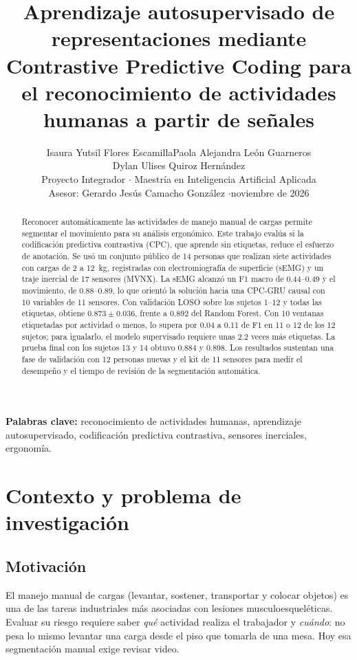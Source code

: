 \documentclass[letterpaper,11pt]{article}
\title{\textbf{Aprendizaje autosupervisado de representaciones mediante Contrastive Predictive Coding para el reconocimiento de actividades humanas a partir de señales}}
\author{Isaura Yutsil Flores Escamilla\quad Paola Alejandra León Guarneros\\[2pt] Dylan Ulises Quiroz Hernández\\[6pt]
  \normalsize Proyecto Integrador $\cdot$ Maestría en Inteligencia Artificial Aplicada \\[6pt]
  \normalsize Asesor: Gerardo Jesús Camacho González \quad$\cdot$\quad noviembre de 2026}
\date{\vspace{-2ex}}
\begin{document}
\maketitle

\begin{abstract}
\noindent
Reconocer automáticamente las actividades de manejo manual de cargas permite segmentar el movimiento para su análisis ergonómico. Este trabajo evalúa si la codificación predictiva contrastiva (CPC), que aprende sin etiquetas, reduce el esfuerzo de anotación. Se usó un conjunto público de 14 personas que realizan siete actividades con cargas de 2 a 12~kg, registradas con electromiografía de superficie (sEMG) y un traje inercial de 17 sensores (MVNX). La sEMG alcanzó un F1 macro de 0.44--0.49 y el movimiento, de 0.88--0.89, lo que orientó la solución hacia una CPC-GRU causal con 10 variables de 11 sensores. Con validación LOSO sobre los sujetos 1--12 y todas las etiquetas, obtiene $0.873 \pm 0.036$, frente a 0.892 del Random Forest. Con 10 ventanas etiquetadas por actividad o menos, lo supera por 0.04 a 0.11 de F1 en 11 o 12 de los 12 sujetos; para igualarlo, el modelo supervisado requiere unas 2.2 veces más etiquetas. La prueba final con los sujetos 13 y 14 obtuvo 0.884 y 0.898. Los resultados sustentan una fase de validación con 12 personas nuevas y el kit de 11 sensores para medir el desempeño y el tiempo de revisión de la segmentación automática.
\end{abstract}

\noindent\textbf{Palabras clave:} reconocimiento de actividades humanas, aprendizaje autosupervisado, codificación predictiva contrastiva, sensores inerciales, ergonomía.

\section{Contexto y problema de investigación}

\subsection{Motivación}
El manejo manual de cargas (levantar, sostener, transportar y colocar objetos) es una de las tareas industriales más asociadas con lesiones musculoesqueléticas. Evaluar su riesgo requiere saber \emph{qué} actividad realiza el trabajador y \emph{cuándo}: no pesa lo mismo levantar una carga desde el piso que tomarla de una mesa. Hoy esa segmentación manual exige revisar video.
\end{document}
